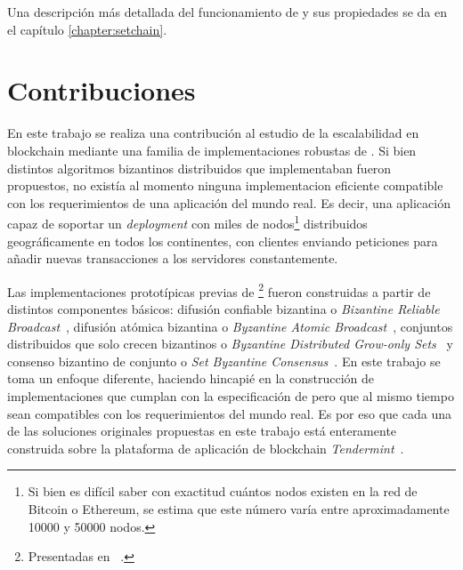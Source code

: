 Una descripción más detallada del funcionamiento de \setchain y sus propiedades se da
en el capítulo \ref{chapter:setchain}.

\section{Contribuciones}\label{sec:contributions}
En este trabajo se realiza una contribución al estudio de la escalabilidad en blockchain mediante 
una familia de implementaciones robustas de \setchain.
%
Si bien distintos algoritmos bizantinos distribuidos que implementaban \setchain fueron
propuestos, no existía al momento ninguna implementacion eficiente compatible con
los requerimientos de una aplicación del mundo real.
Es decir, una aplicación capaz de soportar un \textit{deployment} con miles de nodos\footnote{Si bien
es difícil saber con exactitud cuántos nodos existen en la red de Bitcoin o Ethereum, se estima
que este número varía entre aproximadamente 10000 y 50000 nodos.}
distribuidos geográficamente en todos los continentes, con clientes enviando peticiones para
añadir nuevas transacciones a los servidores constantemente.

Las implementaciones prototípicas previas de \setchain\footnote{Presentadas en ~\cite{Capretto.2022.Setchain}.} fueron construidas
a partir de distintos
componentes básicos: difusión confiable bizantina o \emph{Bizantine Reliable Broadcast}~\cite{DBLP:journals/iandc/Bracha87, raynal.dist.systems},
difusión atómica bizantina o \emph{Byzantine Atomic Broadcast}~\cite{Defago2004BAB},
conjuntos distribuidos que solo crecen bizantinos o \emph{Byzantine Distributed Grow-only Sets}~\cite{Cholvi2021BDSO-arxiv} y
consenso bizantino de conjunto o \emph{Set Byzantine Consensus}~\cite{redbelly}.
%
En este trabajo se toma un enfoque diferente, haciendo hincapié en la construcción de implementaciones
que cumplan con la especificación de \setchain pero que al mismo tiempo sean compatibles con los requerimientos
del mundo real.
Es por eso que cada una de las soluciones originales propuestas en este trabajo está enteramente construida sobre 
la plataforma de aplicación de blockchain \textit{Tendermint}~\cite{Buchman.2018.Tendermint}.




